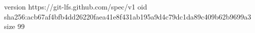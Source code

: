 version https://git-lfs.github.com/spec/v1
oid sha256:acb67af4bfb4dd26220faea41e8f431ab195a9d4c79dc1da89c409b62b9699a3
size 99
